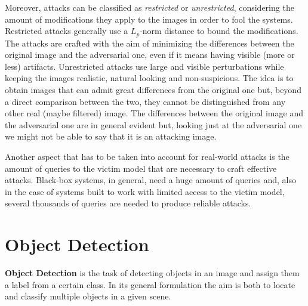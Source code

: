 Moreover, attacks can be classified as {\it restricted} or {\it unrestricted}, considering the amount of modifications they apply to the images in order to fool the systems. 
Restricted attacks generally use a $L_p$-norm distance to bound the modifications. The attacks are crafted with the aim of minimizing the differences between the original image and the adversarial one, even if it means having visible (more or less) artifacts. %
Unrestricted attacks use large and visible perturbations while keeping the images realistic, natural looking and non-suspicious. The idea is to obtain images that can admit great differences from the original one but, beyond a direct comparison between the two, they cannot be distinguished from any other real (maybe filtered) image. %
The differences between the original image and the adversarial one are in general evident but, looking just at the adversarial one we might not be able to say that it is an attacking image.  
 
Another aspect that has to be taken into account 
for real-world attacks is the amount of queries to the victim model that are necessary to craft effective attacks. Black-box systems, in general, need a huge amount of queries and, also in the case of systems built to work with limited access to the victim model, several thousands of queries are needed to produce reliable attacks.

\section{Object Detection}
\textbf{Object Detection} is the task of detecting objects in an image and assign them a label from a certain class. In its general formulation the aim is both to locate and classify multiple objects in a given scene.

